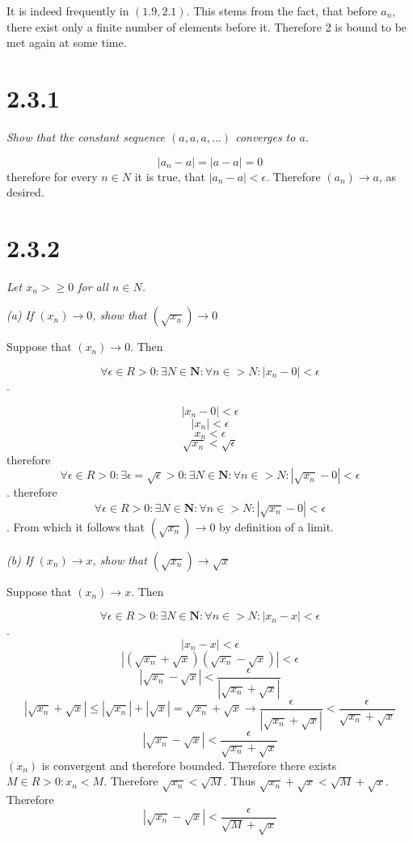 \documentclass[11pt,oneside,titlepage]{book}
\begin{document}
It is indeed frequently in $(1.9, 2.1)$. This stems from the fact, that before $a_n$,
there exist only a finite number of elements before it. Therefore 2 is bound to
be met again at some time.

\section*{2.3.1}
\textit{Show that the constant sequence $(a, a, a, ...)$ converges to $a$.}

$$|a_n - a| = |a - a| = 0$$
therefore for every $n \in N$ it is true, that $|a_n - a| < \epsilon$.
Therefore $(a_n) \to a$, as desired.

\section*{2.3.2}
\textit{Let $x_n >\geq 0$ for all $n \in N$.}

\textit{(a) If $(x_n) \to 0$, show that $(\sqrt{x_n}) \to 0$}

Suppose that $(x_n) \to 0$. Then

$$\forall \epsilon \in R > 0: \exists N \in \textbf{N}: \forall n \in  > N:
|x_n - 0| < \epsilon$$.

$$|x_n - 0| < \epsilon$$
$$|x_n| < \epsilon$$
$$x_n < \epsilon$$
$$\sqrt{x_n} < \sqrt{\epsilon}$$
therefore
$$\forall \epsilon \in R > 0: \exists \epsilon = \sqrt{\epsilon} > 0:
\exists N \in \textbf{N}: \forall n \in  > N: |\sqrt{x_n} - 0| < \epsilon$$.
therefore
$$\forall \epsilon \in R > 0: 
\exists N \in \textbf{N}: \forall n \in  > N: |\sqrt{x_n} - 0| < \epsilon$$.
From which it follows that $(\sqrt{x_n}) \to 0$ by definition of a limit.

\textit{(b) If $(x_n) \to x$, show that $(\sqrt{x_n}) \to \sqrt{x}$}

Suppose that $(x_n) \to x$. Then

$$\forall \epsilon \in R > 0: \exists N \in \textbf{N}: \forall n \in  > N:
|x_n - x| < \epsilon$$.
$$|x_n - x|  < \epsilon$$
$$|(\sqrt{x_n} + \sqrt{x})(\sqrt{x_n} - \sqrt{x})|  < \epsilon$$
$$|\sqrt{x_n} - \sqrt{x}|  < \frac{\epsilon}{|\sqrt{x_n} + \sqrt{x}|}$$
$$ |\sqrt{x_n} + \sqrt{x}| \leq |\sqrt{x_n}| + |\sqrt{x}| = \sqrt{x_n} +
\sqrt{x} \to \frac{\epsilon}{|\sqrt{x_n} + \sqrt{x}|} <
\frac{\epsilon}{\sqrt{x_n} + \sqrt{x}}$$
$$|\sqrt{x_n} - \sqrt{x}|  < \frac{\epsilon}{\sqrt{x_n} + \sqrt{x}}$$
$(x_n)$ is convergent and therefore bounded. Therefore there exists
$M \in R > 0: x_n < M$. Therefore $\sqrt{x_n} < \sqrt{M}$. Thus
$\sqrt{x_n} + \sqrt{x} < \sqrt{M} + \sqrt{x}$. Therefore
$$|\sqrt{x_n} - \sqrt{x}|  < \frac{\epsilon}{\sqrt{M} + \sqrt{x}}$$
\end{document}
